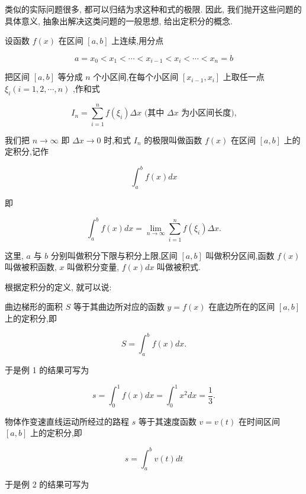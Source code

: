 \documentclass[lang=cn,newtx,10pt,scheme=chinese]{elegantbook}
\begin{document}
类似的实际问题很多, 都可以归结为求这种和式的极限. 因此, 我们抛开这些问题的具体意义, 抽象出解决这类问题的一般思想, 给出定积分的概念.
\begin{definition}[定积分]

设函数 \(f\left( x\right)\) 在区间 \(\left\lbrack {a,b}\right\rbrack\) 上连续,用分点

\[
a = {x}_{0} < {x}_{1} < \cdots < {x}_{i - 1} < {x}_{i} < \cdots < {x}_{n} = b
\]

把区间 \(\left\lbrack {a,b}\right\rbrack\) 等分成 \(n\) 个小区间,在每个小区间 \(\left\lbrack {{x}_{i - 1},{x}_{i}}\right\rbrack\) 上取任一点 \({\xi }_{i}\left( {i = 1,2,\cdots ,n}\right)\) ,作和式

\[
{I}_{n} = \mathop{\sum }\limits_{{i = 1}}^{n}f\left( {\xi }_{i}\right) {\Delta x}\text{ (其中 }{\Delta x}\text{ 为小区间长度),}
\]

我们把 \(n \rightarrow \infty\) 即 \({\Delta x} \rightarrow 0\) 时,和式 \({I}_{n}\) 的极限叫做函数 \(f\left( x\right)\) 在区间 \(\left\lbrack {a,b}\right\rbrack\) 上的定积分,记作

\[
{\int }_{a}^{b}f\left( x\right) {dx}
\]

即

\[
{\int }_{a}^{b}f\left( x\right) {dx} = \mathop{\lim }\limits_{{n \rightarrow \infty }}\mathop{\sum }\limits_{{i = 1}}^{n}f\left( {\xi }_{i}\right) {\Delta x}.
\]

这里, \(a\) 与 \(b\) 分别叫做积分下限与积分上限,区间 \(\left\lbrack {a,b}\right\rbrack\) 叫做积分区间,函数 \(f\left( x\right)\) 叫做被积函数, \(x\) 叫做积分变量, \(f\left( x\right) {dx}\) 叫做被积式.

\end{definition}

根据定积分的定义, 就可以说:

曲边梯形的面积 \(S\) 等于其曲边所对应的函数 \(y = f\left( x\right)\) 在底边所在的区间 \(\left\lbrack {a,b}\right\rbrack\) 上的定积分,即

\[
S = {\int }_{a}^{b}f\left( x\right) {dx}.
\]

于是例 1 的结果可写为

\[
s = {\int }_{0}^{1}f\left( x\right) {dx} = {\int }_{0}^{1}{x}^{2}{dx} = \frac{1}{3}.
\]

物体作变速直线运动所经过的路程 \(s\) 等于其速度函数 \(v = v\left( t\right)\) 在时间区间 \(\left\lbrack {a,b}\right\rbrack\) 上的定积分,即

\[
s = {\int }_{a}^{b}v\left( t\right) {dt}
\]

于是例 2 的结果可写为
\end{document}
